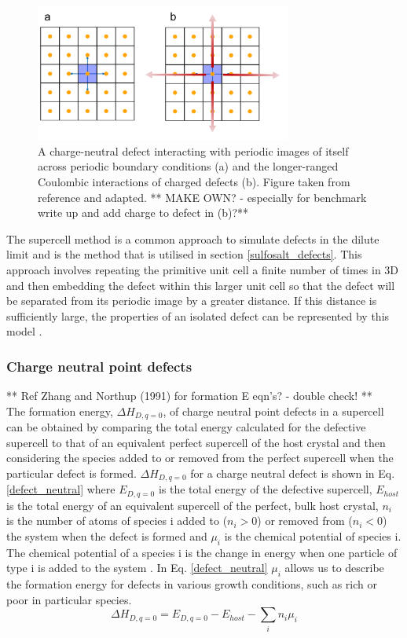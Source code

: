 \documentclass[11pt, twoside]{report}
\begin{document}
\begin{figure}[h!]
  \centering
    \includegraphics[width=0.75\textwidth]{figures/ase_defects.png}
    \caption{A charge-neutral defect interacting with periodic images of itself across periodic boundary conditions (a) and the longer-ranged Coulombic interactions of charged defects (b). Figure taken from reference  and adapted. ** MAKE OWN? - especially for benchmark write up and add charge to defect in (b)?**}
  \label{defect_PBCs}
\end{figure}

The supercell method is a common approach to simulate defects in the dilute limit and is the method that is utilised in section \ref{sulfosalt_defects}. This approach involves repeating the primitive unit cell a finite number of times in 3D and then embedding the defect within this larger unit cell so that the defect will be separated from its periodic image by a greater distance. If this distance is sufficiently large, the properties of an isolated defect can be represented by this model \cite{freysoldt_rev}.

\subsubsection{Charge neutral point defects}
** Ref Zhang and Northup (1991) for formation E eqn's? - double check! **\\

The formation energy, $\Delta H_{D,q=0}$, of charge neutral point defects in a supercell can be obtained by comparing the total energy calculated for the defective supercell to that of an equivalent perfect supercell of the host crystal and then considering the species added to or removed from the perfect supercell when the particular defect is formed. $\Delta H_{D,q=0}$ for a charge neutral defect is shown in Eq. \ref{defect_neutral} where $E_{D,q=0}$ is the total energy of the defective supercell, $E_{host}$ is the total energy of an equivalent supercell of the perfect, bulk host crystal, $n_i$ is the number of atoms of species i added to ($n_i > 0 $) or removed from ($n_i < 0$) the system when the defect is formed and $\mu_i$ is the chemical potential of species i. The chemical potential of a species i is the change in energy when one particle of type i is added to the system \cite{chem_pot}. In Eq. \ref{defect_neutral} $\mu_i$ allows us to describe the formation energy for defects in various growth conditions, such as rich or poor in particular species.
\begin{equation}\label{defect_neutral}
\Delta H_{D,q=0} = E_{D,q=0} - E_{host} - \sum_i n_i \mu_i
\end{equation}
\end{document}
